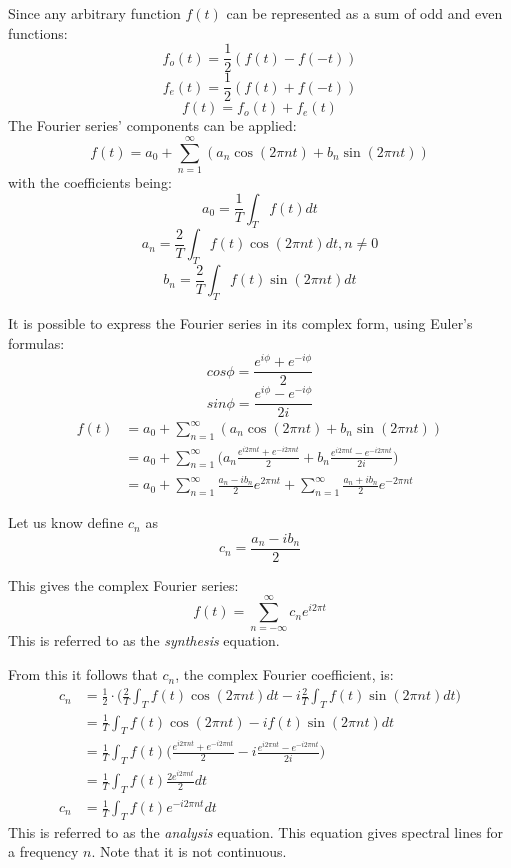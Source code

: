 \documentclass{article}
\begin{document}
Since any arbitrary function $f(t)$ can be represented as a sum of odd and even 
functions:
$$f_o(t) = \frac{1}{2}(f(t) - f(-t))$$
$$f_e(t) = \frac{1}{2}(f(t) + f(-t))$$
$$f(t) = f_o(t) + f_e(t)$$
The Fourier series' components can be applied:
$$f(t) = a_0 + \sum^{\infty}_{n=1} (a_n \cos(2 \pi n t) + b_n \sin(2 \pi n t))$$
with the coefficients being:
$$a_0 = \frac{1}{T} \int_T f(t) dt$$
$$a_n = \frac{2}{T} \int_T f(t) \cos(2 \pi n t) dt, n \neq 0$$
$$b_n = \frac{2}{T} \int_T f(t) \sin(2 \pi n t) dt$$

It is possible to express the Fourier series in its complex form, using 
Euler's formulas:
$$cos \phi = \frac{e^{i\phi} + e^{-i\phi}}{2}$$
$$sin \phi = \frac{e^{i\phi} - e^{-i\phi}}{2i}$$
\begin{equation*}
	\begin{aligned}
		f(t) &=
		a_0 + \sum^{\infty}_{n=1}(a_n \cos(2 \pi n t) + b_n \sin(2 \pi n t)) \\
		& = a_0 + \sum^{\infty}_{n=1}\Big(
		a_n \frac{e^{i 2 \pi n t} + e^{-i 2 \pi n t}}{2} + 
		b_n \frac{e^{i 2 \pi n t} - e^{-i 2 \pi n t}}{2i}\Big) \\
		&= a_0 + \sum^{\infty}_{n=1} \frac{a_n - ib_n}{2}e^{2 \pi n t} +
		\sum^{\infty}_{n=1} \frac{a_n + ib_n}{2} e^{-2 \pi n t}
	\end{aligned}
\end{equation*}

Let us know define $c_n$ as 
$$c_n = \frac{a_n - i b_n}{2}$$

This gives the complex Fourier series:
\begin{equation*}
	f(t) = \sum^{\infty}_{n = - \infty} c_n e^{i 2 \pi t}
\end{equation*}
This is referred to as the \textit{synthesis} equation.

From this it follows that $c_n$, the complex Fourier coefficient, is:
\begin{equation*}
	\begin{aligned}
		c_n &= 
		\frac{1}{2} \cdot \bigg( \frac{2}{T} \int_T f(t) \cos(2 \pi n t) dt - 
		i \frac{2}{T} \int_T f(t) \sin(2 \pi n t) dt \bigg) \\
		&= \frac{1}{T} \int_T f(t) \cos(2 \pi n t) - i f(t) \sin(2 \pi n t) dt \\
		&= \frac{1}{T} \int_T f(t) \bigg( 
			\frac{e^{i 2 \pi n t} + e^{-i 2 \pi n t}}{2} - 
		i \frac{e^{i 2 \pi n t} - e^{-i 2 \pi n t}}{2i} \bigg) \\
		&= \frac{1}{T} \int_T f(t) \frac{2 e^{i 2 \pi n t}}{2} dt \\
		c_n &= \frac{1}{T} \int_T f(t) e^{-i 2 \pi n t} dt
	\end{aligned}
\end{equation*}
This is referred to as the \textit{analysis} equation. This equation gives 
spectral lines for a frequency $n$. Note that it is not continuous.
\end{document}
